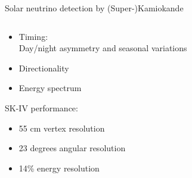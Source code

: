 \begin{frame}[t]{Solar neutrino detection by (Super-)Kamiokande}
\begin{columns}
\begin{column}{0.30\textwidth}
{     \vspace{0.2cm}
     \begin{itemize}
       \item Timing:\\
          Day/night asymmetry and seasonal variations
       \item Directionality
       \item Energy spectrum
     \end{itemize}
     \vspace{0.2cm}
     SK-IV performance:\\
     \begin{itemize}
       \item 55 cm vertex resolution
       \item 23 degrees angular resolution
       \item 14\% energy resolution
     \end{itemize}
    }
  \end{column}
\end{columns}
\end{frame}

